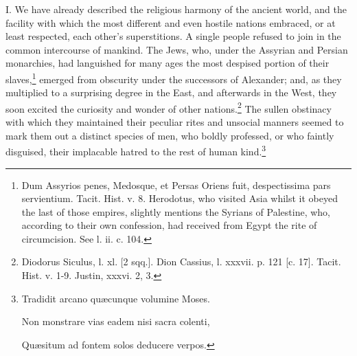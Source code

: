 I. We have already described the religious harmony of the ancient world, and the facility with which the most different and even hostile nations embraced, or at least respected, each other\texthebrew{}’s superstitions. A single people refused to join in the common intercourse of mankind. The Jews, who, under the Assyrian and Persian monarchies, had languished for many ages the most despised portion of their slaves,\footnote{Dum Assyrios penes, Medosque, et Persas Oriens fuit, despectissima pars servientium. Tacit. Hist. v. 8. Herodotus, who visited Asia whilst it obeyed the last of those empires, slightly mentions the Syrians of Palestine, who, according to their own confession, had received from Egypt the rite of circumcision. See l. ii. c. 104.} emerged from obscurity under the successors of Alexander; and, as they multiplied to a surprising degree in the East, and afterwards in the West, they soon excited the curiosity and wonder of other nations.\footnote{Diodorus Siculus, l. xl. [2 sqq.]. Dion Cassius, l. xxxvii. p. 121 [c. 17]. Tacit. Hist. v. 1-9. Justin, xxxvi. 2, 3.} The sullen obstinacy with which they maintained their peculiar rites and unsocial manners seemed to mark them out a distinct species of men, who boldly professed, or who faintly disguised, their implacable hatred to the rest of human kind.\footnote{Tradidit arcano quæcunque volumine Moses.

Non monstrare vias eadem nisi sacra colenti,

Quæsitum ad fontem solos deducere verpos.

}
